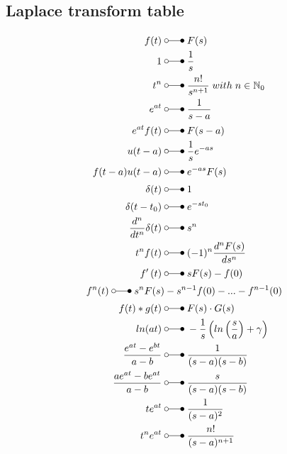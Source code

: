 \subsection{Laplace transform table}
\begin{align*}
    f(t)                            \;&\laplace\; F(s) \\
    1                               \;&\laplace\; \frac{1}{s} \\
    t^{n}                           \;&\laplace\; \frac{n!}{s^{n+1}} \; with \; n \in \mathbb{N}_0 \\
    e^{at}                          \;&\laplace\; \frac{1}{s-a}  \\
    e^{at}f(t)                      \;&\laplace\; F(s-a) \\
    u(t-a)                          \;&\laplace\; \frac{1}{s}e^{-as} \\
    f(t-a)u(t-a)                    \;&\laplace\; e^{-as}F(s) \\
    \delta(t)                       \;&\laplace\; 1\\
    \delta(t-t_{0})                 \;&\laplace\; e^{-st_{0}} \\
    \frac{d^{n}}{dt^{n}}\delta(t)   \;&\laplace\; s^{n}  \\
    t^{n}f(t)                       \;&\laplace\; (-1)^n \frac{d^nF(s)}{ds^n}  \\
    f^{\prime}\left(t\right)        \;&\laplace\; \begin{aligned}sF(s)-f(0)\end{aligned}  \\
    f^{n}(t)                        \; \laplace\; s^nF(s)&-s^{n-1}f(0)-...-f^{n-1}(0)  \\
    f(t)*g(t)                       \;&\laplace\; \begin{aligned}F(s)\cdot G(s)\end{aligned}  \\
    ln(at)                          \;&\laplace\; -\frac{1}{s}\left(ln\left(\frac sa\right)+\gamma\right)  \\ 
    \frac{e^{at}-e^{bt}}{a-b}       \;&\laplace\; \frac{1}{(s-a)(s-b)} \\
    \frac{ae^{at}-be^{at}}{a-b}     \;&\laplace\; \frac{s}{(s-a)(s-b)} \\
    te^{at}                         \;&\laplace\; \frac{1}{(s-a)^2}  \\
    t^{n}e^{at}                     \;&\laplace\; \frac{n!}{(s-a)^{n+1}}  \\

\end{align*}
